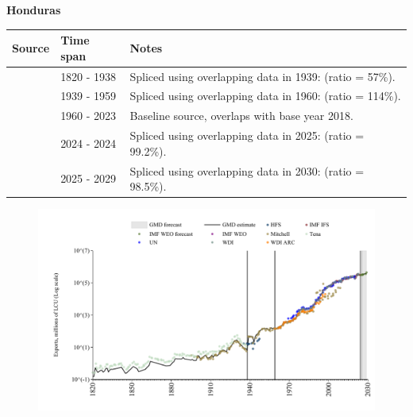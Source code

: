 \documentclass[12pt,a4paper,landscape]{article}
\begin{document}
\begin{adjustbox}{max totalsize={\paperwidth}{\paperheight},center}
\begin{minipage}[t][\textheight][t]{\textwidth}
\vspace*{0.5cm}
{}
\begin{center}
{\Large\bfseries Honduras}
\end{center}
\vspace{0.5cm}
\begin{table}[H]
\centering
\small
\begin{tabular}{|l|l|l|}
\hline
\textbf{Source} & \textbf{Time span} & \textbf{Notes} \\
\hline
\rowcolor{white}\cite{Tena}& 1820 - 1938 &Spliced using overlapping data in 1939: (ratio = 57\%).\\
\rowcolor{lightgray}\cite{Mitchell}& 1939 - 1959 &Spliced using overlapping data in 1960: (ratio = 114\%).\\
\rowcolor{white}\cite{WDI}& 1960 - 2023 &Baseline source, overlaps with base year 2018.\\
\rowcolor{lightgray}\cite{IMF_IFS}& 2024 - 2024 &Spliced using overlapping data in 2025: (ratio = 99.2\%).\\
\rowcolor{white}\cite{IMF_WEO_forecast}& 2025 - 2029 &Spliced using overlapping data in 2030: (ratio = 98.5\%).\\
\hline
\end{tabular}
\end{table}
\begin{figure}[H]
\centering
\includegraphics[width=\textwidth,height=0.6\textheight,keepaspectratio]{graphs/HND_exports.pdf}
\end{figure}
\end{minipage}
\end{adjustbox}
\end{document}
